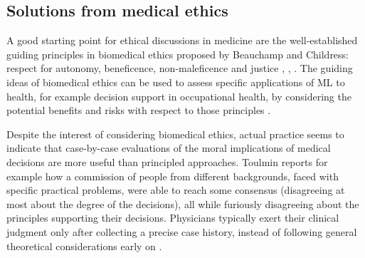 \subsection{Solutions from medical ethics}
    A good starting point for ethical discussions in medicine are the well-established guiding principles in biomedical ethics proposed by Beauchamp and Childress: respect for autonomy, beneficence, non-maleficence and justice \cite[pp.~344-345]{Dijkstra2020}, \cite[p.~2]{Morley2020}, \cite[p.~2]{Rajkomar2018}.
    The guiding ideas of biomedical ethics can be used to assess specific applications of ML to health, for example decision support in occupational health, by considering the potential benefits and risks with respect to those principles \cite{Dijkstra2020}.

    Despite the interest of considering biomedical ethics, actual practice seems to indicate that case-by-case evaluations of the moral implications of medical decisions are more useful than principled approaches.
    Toulmin\cite{Toulmin1982} reports for example how a commission of people from different backgrounds, faced with specific practical problems, were able to reach some consensus (disagreeing at most about the degree of the decisions), all while furiously disagreeing about the principles supporting their decisions.
    Physicians typically exert their clinical judgment only after collecting a precise case history, instead of following general theoretical considerations early on \cite{Toulmin1982}.
